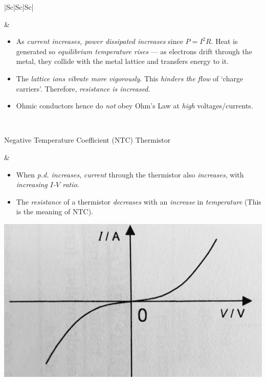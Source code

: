 \documentclass[oneside]{book}
\begin{document}
\begin{itemize}
\begin{longtable}{|Sc|Sc|Sc|}
\begin{minipage}{0.3\textwidth}
        \end{minipage} &
        \begin{minipage}{0.3\textwidth}
            \begin{itemize}
                \item As \emph{current increases, power dissipated increases} since \(P=I^2R\). Heat is generated so \emph{equilibrium temperature rises} --- as electrons drift through the metal, they collide with the metal lattice and transfers energy to it. 
                \item The \emph{lattice ions vibrate more vigorously}. This \emph{hinders the flow} of `charge carriers'. Therefore, \emph{resistance is increased}.
                \item Ohmic conductors hence do \emph{not} obey Ohm's Law at \emph{high} voltages/currents.
            \end{itemize}
        \end{minipage}\\
        \hline
        \begin{minipage}{0.25\textwidth}
            Negative Temperature Coefficient (NTC) Thermistor
        \end{minipage} &  
        \begin{minipage}{0.3\textwidth}
            \begin{itemize}
                \item When \emph{p.d. increases}, \emph{current} through the thermistor also \emph{increases}, with \emph{increasing \(I\)-\(V\) ratio}.
                \item The \emph{resistance} of a thermistor \emph{decreases} with an \emph{increase} in \emph{temperature} (This is the meaning of NTC).
            \end{itemize} 
            \includegraphics[width=\textwidth]{../images/NTC I-V.jpg}\\[-1mm]

\end{minipage}
\end{longtable}
\end{itemize}
\end{document}
